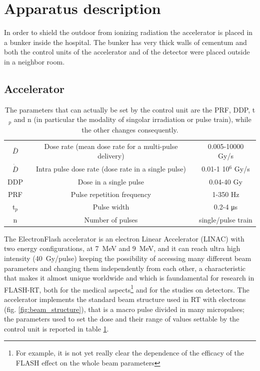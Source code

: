 \section{Apparatus description}
   In order to shield the outdoor from ionizing radiation the accelerator is placed in a bunker inside the hospital. The bunker has very thick walls of cementum and both the control units of the accelerator and of the detector were placed outside in a neighbor room. 
   \subsection{Accelerator}
      \begin{table}
         \begin{center}
         \begin{tabular}{| c | c | c |}
         \hline
      $\bar{D}$ & Dose rate (mean dose rate for a multi-pulse delivery) & 0.005-10000 Gy/s\\
      $\Dot{\bar{D}}$ & Intra pulse dose rate (dose rate in a single pulse) &  0.01-1 10$^6$ Gy/s  \\
      DDP & Dose in a single pulse & 0.04-40 Gy\\
      PRF & Pulse repetition frequency & 1-350 Hz\\
      t$_{p}$ & Pulse width & 0.2-4 \si{\us}\\
      n & Number of pulses & single/pulse train \\
      \hline
         \end{tabular}
         \caption{The parameters that can actually be set by the control unit are the PRF, DDP, t$_p$ and n (in particular the modality of singolar irradiation or pulse train), while the other changes consequently.}
         \label{tab:beam_parameters}
         \end{center}
      \end{table}  
      The ElectronFlash accelerator is an electron Linear Accelerator (LINAC) with two energy configurations, at \SI{7}{MeV} and \SI{9}{MeV}, and it can reach ultra high intensity (\SI{40}{Gy/pulse}) keeping the possibility of accessing many different beam parameters and changing them independently from each other, a characteristic that makes it almost unique worldwide and which is faundamental for research in FLASH-RT, both for the medical aspects\footnote{For example, it is not yet really clear the dependence of the efficacy of the FLASH effect on the whole beam parameters} and for the studies on detectors. 
      The accelerator implements the standard beam structure used in RT with electrons (fig. \ref{fig:beam_structure}), that is a macro pulse divided in many micropulses; the parameters used to set the dose and their range of values settable by the control unit is reported in table \ref{tab:beam_parameters}. 

